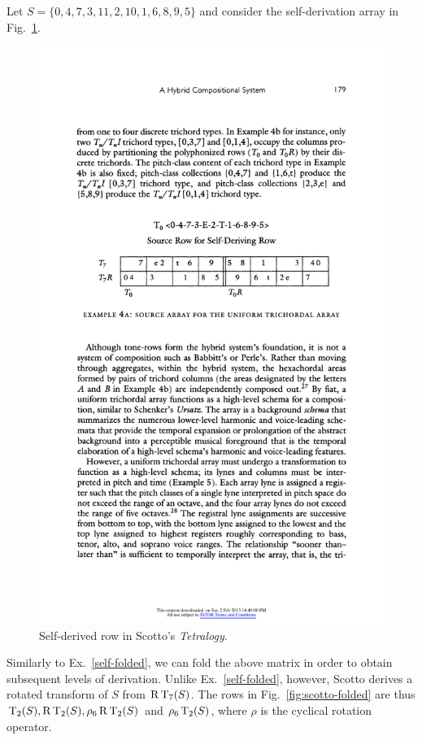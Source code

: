 \begin{example}
    \cite[180]{Scotto2000}
    \label{ex:scotto}
    Let $S = \{ 0, 4, 7, 3, 11, 2, 10, 1, 6, 8, 9, 5 \}$ and consider the self-derivation array in Fig.~\ref{fig:scotto-array}.
    
    \begin{figure}[htbp]
    	\centering
    	\includegraphics[width=5in]{figures/scotto-array.pdf}
		\caption[Self-derived row in Scotto's \emph{Tetralogy}]{Self-derived row in Scotto's \emph{Tetralogy}.}
    	\label{fig:scotto-array}
	\end{figure}
	
	\noindent Similarly to Ex.~\ref{self-folded}, we can fold the above matrix in order to obtain subsequent levels of derivation. Unlike Ex.~\ref{self-folded}, however, Scotto derives a rotated transform of $S$ from $\operatorname{R}\operatorname{T}_7(S)$. The rows in Fig.~\ref{fig:scotto-folded} are thus $\operatorname{T}_2(S), \operatorname{R}\operatorname{T}_2(S), \rho_6\operatorname{R}\operatorname{T}_2(S)$ and $\rho_6\operatorname{T}_2(S)$, where $\rho$ is the cyclical rotation operator.
	

\end{example}
